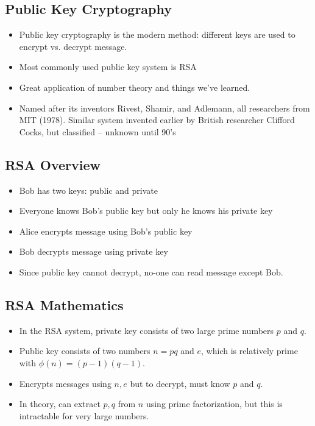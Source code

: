 \documentclass{scrreprt}
\begin{document}
\subsection{Public Key Cryptography}
\begin{itemize}
    \item Public key cryptography is the modern method: different keys are used
          to encrypt vs. decrypt message.
    \item Most commonly used public key system is RSA
    \item Great application of number theory and things we've learned.
    \item Named after its inventors Rivest, Shamir, and Adlemann, all researchers
          from MIT (1978). Similar system invented earlier by British researcher
          Clifford Cocks, but classified -- unknown until 90's
\end{itemize}

\subsection{RSA Overview}

\begin{itemize}
    \item Bob has two keys: public and private
    \item Everyone knows Bob's public key but only he knows his private key
    \item Alice encrypts message using Bob's public key
    \item Bob decrypts message using private key
    \item Since public key cannot decrypt, no-one can read message except Bob.
\end{itemize}

\subsection{RSA Mathematics}

\begin{itemize}
    \item In the RSA system, private key consists of two large prime numbers $p$ and $q$.
    \item Public key consists of two numbers $n = pq$ and $e$, which is relatively prime with $\phi(n)=(p-1)(q-1)$.
    \item Encrypts messages using $n, e$ but to decrypt, must know $p$ and $q$.
    \item In theory, can extract $p, q$ from $n$ using prime factorization, but this is intractable for very
          large numbers.
\end{itemize}
\end{document}
